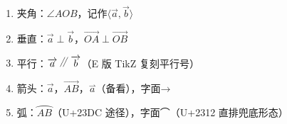 \documentclass[fontset=none]{ctexart}
\newcommand{\qppar}{\mathrel{\begin{tikzpicture}[x=1em,y=1em,baseline={(0,0)}]
  \fill (-0.412,-0.016) -- (-0.375,-0.016) -- (0.114,0.956) -- (0.077,0.956) -- cycle;
  \fill (-0.115,-0.016) -- (-0.078,-0.016) -- (0.411,0.956) -- (0.374,0.956) -- cycle;
\end{tikzpicture}}}
\renewcommand{\parallel}{\qppar}
\begin{document}
\fontsize{10.09pt}{18.25pt}\selectfont
\begin{enumerate}
\item 夹角：\(\angle AOB\)，记作\(\langle\overrightarrow{a},\overrightarrow{b}\rangle\)
\item 垂直：\(\overrightarrow{a}\perp\overrightarrow{b}\)，\(\overrightarrow{OA}\perp\overrightarrow{OB}\)
\item 平行：\(\overrightarrow{a}\parallel\overrightarrow{b}\)（E 版 TikZ 复刻平行号）
\item 箭头：\(\overrightarrow{a}\)，\(\overrightarrow{AB}\)，\(\overset{\scriptscriptstyle\rightharpoonup}{a}\)（备看），字面\(\mathord{→}\)
\item 弧：\(\overparen{AB}\)（U+23DC 途径），字面⌒（U+2312 直排兜底形态）
\end{enumerate}
\end{document}
